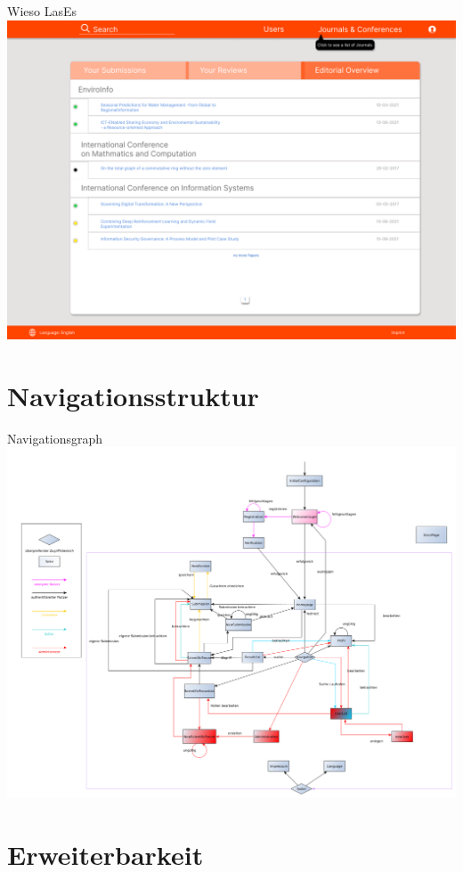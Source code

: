 \documentclass{beamer}
\begin{document}
\begin{frame}{Wieso LasEs}
	\centering
	\includegraphics[height=0.75\textheight]{../../docs/Pflichtenheft/graphics/Homepage-png}
\end{frame}

\section{Navigationsstruktur}
\begin{frame}{Navigationsgraph}
	\centering
	\includegraphics[height=0.8\textheight]{../../docs/Pflichtenheft/graphics/benutzerFlussyEd-png}
\end{frame}

\section{Erweiterbarkeit}
\end{document}
